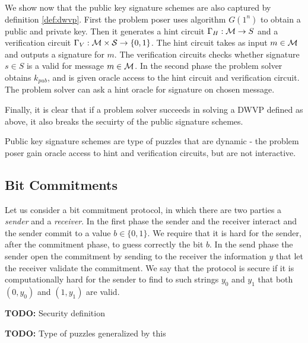 \documentclass[11pt,a4paper,titlepage]{memoir}
\begin{document}
We show now that the public key signature schemes are also captured by definition \ref{def:dwvp}.
First the problem poser uses algorithm $G(1^n)$ to obtain a public and private key.
Then it generates a hint circuit $\Gamma_H : \mathcal{M} \rightarrow S$ and a verification circuit $\Gamma_V : \mathcal{M} \times \mathcal{S} \rightarrow \{0,1\}$.
The hint circuit takes as input $m \in \mathcal{M}$ and outputs a signature for $m$. The verification circuits checks whether
signature $s \in S$ is a valid for message $m \in \mathcal{M}$.
In the second phase the problem solver obtains $k_{pub}$, and is given oracle access to the hint circuit and verification circuit.
The problem solver can ask a hint oracle for signature on chosen message.

Finally, it is clear that if a problem solver succeeds in solving a DWVP defined as above, it also breaks the secuirty of the public signature schemes.

Public key signature schemes are type of puzzles that are dynamic - the problem poser gain oracle access to hint and verification circuits,
but are not interactive.

\subsection{Bit Commitments}
\cite{LectureNotesComThCrypto}
Let us consider a bit commitment protocol, in which there are two parties a \textit{sender} and a \textit{receiver}.
In the first phase the sender and the receiver interact and the sender commit to a value $b \in \{0,1\}$.
We require that it is hard for the sender, after the commitment phase, to guess correctly the bit $b$.
In the send phase the sender open the commitment by sending to the receiver the information $y$ that let
the receiver validate the commitment.
We say that the protocol is secure if it is computationally hard for the sender to find to such strings $y_0$ and $y_1$
that both $(0, y_0)$ and $(1, y_1)$ are valid.

\begin{todo}
  \textbf{TODO:} Security definition
\end{todo}

\begin{todo}
  \textbf{TODO:} Type of puzzles generalized by this
\end{todo}
\end{document}
